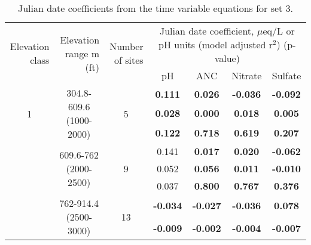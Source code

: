 \begin{table}[htbp]
  \centering
  \caption{Julian date coefficients from the time variable equations for set 3.}
    \begin{tabular}{rrrcccc}
     \toprule
    \multirow{3}[4]{2cm}{Elevation class} & \multirow{3}[4]{2.5cm}{Elevation range m (ft)} & \multirow{3}[4]{2cm}{Number of sites} & \multicolumn{4}{c}{\multirow{2}[2]{7cm}{Julian date coefficient, $\mu$eq/L or pH units (model adjusted r$^2$) (p-value)}} \\ 
          &       &       & \multicolumn{4}{c}{}\bigstrut\\\cline{4-7}\noalign{\smallskip}
          &       &       & pH    & ANC   & Nitrate & Sulfate \\
\midrule
    \multicolumn{1}{c}{\multirow{3}[2]{*}{1}} & \multicolumn{1}{c}{\multirow{3}[2]{2.5cm}{304.8-609.6 (1000-2000)}} & \multicolumn{1}{c}{\multirow{3}[2]{*}{5}} & \textbf{0.111 } & \textbf{0.026 } & \textbf{-0.036 } & \textbf{-0.092 } \\
    \multicolumn{1}{c}{} & \multicolumn{1}{c}{} & \multicolumn{1}{c}{} & \textbf{0.028 } & \textbf{0.000 } & \textbf{0.018 } & \textbf{0.005 } \\
    \multicolumn{1}{c}{} & \multicolumn{1}{c}{} & \multicolumn{1}{c}{} & \textbf{0.122 } & \textbf{0.718 } & \textbf{0.619 } & \textbf{0.207 }\bigstrut\\\cline{4-7}\noalign{\smallskip}
    \multicolumn{1}{c}{\multirow{3}[2]{*}{2}} & \multicolumn{1}{c}{\multirow{3}[2]{2.5cm}{609.6-762 (2000-2500)}} & \multicolumn{1}{c}{\multirow{3}[2]{*}{9}} & 0.141  & \textbf{0.017 } & \textbf{0.020 } & \textbf{-0.062 } \\
    \multicolumn{1}{c}{} & \multicolumn{1}{c}{} & \multicolumn{1}{c}{} & 0.052  & \textbf{0.056 } & \textbf{0.011 } & \textbf{-0.010 } \\
    \multicolumn{1}{c}{} & \multicolumn{1}{c}{} & \multicolumn{1}{c}{} & 0.037  & \textbf{0.800 } & \textbf{0.767 } & \textbf{0.376 }\bigstrut\\\cline{4-7}\noalign{\smallskip}
    \multicolumn{1}{c}{\multirow{3}[2]{*}{3}} & \multicolumn{1}{c}{\multirow{3}[2]{2.5cm}{762-914.4 (2500-3000)}} & \multicolumn{1}{c}{\multirow{3}[2]{*}{13}} & \textbf{-0.034 } & \textbf{-0.027 } & \textbf{-0.036 } & \textbf{0.078 } \\
    \multicolumn{1}{c}{} & \multicolumn{1}{c}{} & \multicolumn{1}{c}{} & \textbf{-0.009 } & \textbf{-0.002 } & \textbf{-0.004 } & \textbf{-0.007 } \\

\end{tabular}
\end{table}

